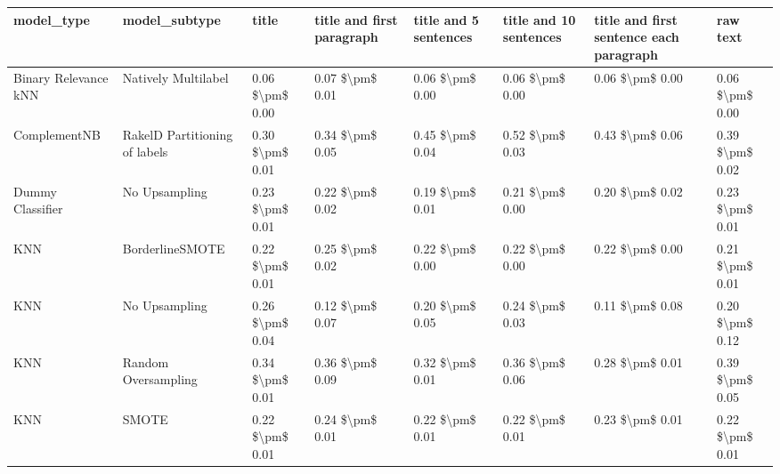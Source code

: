 \begin{tabular}{llllllll}
\toprule
                     model\_type &                 model\_subtype &           title & title and first paragraph & title and 5 sentences & title and 10 sentences & title and first sentence each paragraph &            raw text \\
\midrule
           Binary Relevance kNN &           Natively Multilabel & 0.06 \$\textbackslash pm\$ 0.00 &           0.07 \$\textbackslash pm\$ 0.01 &       0.06 \$\textbackslash pm\$ 0.00 &        0.06 \$\textbackslash pm\$ 0.00 &                         0.06 \$\textbackslash pm\$ 0.00 &     0.06 \$\textbackslash pm\$ 0.00 \\
                   ComplementNB & RakelD Partitioning of labels & 0.30 \$\textbackslash pm\$ 0.01 &           0.34 \$\textbackslash pm\$ 0.05 &       0.45 \$\textbackslash pm\$ 0.04 &        0.52 \$\textbackslash pm\$ 0.03 &                         0.43 \$\textbackslash pm\$ 0.06 &     0.39 \$\textbackslash pm\$ 0.02 \\
               Dummy Classifier &                 No Upsampling & 0.23 \$\textbackslash pm\$ 0.01 &           0.22 \$\textbackslash pm\$ 0.02 &       0.19 \$\textbackslash pm\$ 0.01 &        0.21 \$\textbackslash pm\$ 0.00 &                         0.20 \$\textbackslash pm\$ 0.02 &     0.23 \$\textbackslash pm\$ 0.01 \\
                            KNN &               BorderlineSMOTE & 0.22 \$\textbackslash pm\$ 0.01 &           0.25 \$\textbackslash pm\$ 0.02 &       0.22 \$\textbackslash pm\$ 0.00 &        0.22 \$\textbackslash pm\$ 0.00 &                         0.22 \$\textbackslash pm\$ 0.00 &     0.21 \$\textbackslash pm\$ 0.01 \\
                            KNN &                 No Upsampling & 0.26 \$\textbackslash pm\$ 0.04 &           0.12 \$\textbackslash pm\$ 0.07 &       0.20 \$\textbackslash pm\$ 0.05 &        0.24 \$\textbackslash pm\$ 0.03 &                         0.11 \$\textbackslash pm\$ 0.08 &     0.20 \$\textbackslash pm\$ 0.12 \\
                            KNN &           Random Oversampling & 0.34 \$\textbackslash pm\$ 0.01 &           0.36 \$\textbackslash pm\$ 0.09 &       0.32 \$\textbackslash pm\$ 0.01 &        0.36 \$\textbackslash pm\$ 0.06 &                         0.28 \$\textbackslash pm\$ 0.01 &     0.39 \$\textbackslash pm\$ 0.05 \\
                            KNN &                         SMOTE & 0.22 \$\textbackslash pm\$ 0.01 &           0.24 \$\textbackslash pm\$ 0.01 &       0.22 \$\textbackslash pm\$ 0.01 &        0.22 \$\textbackslash pm\$ 0.01 &                         0.23 \$\textbackslash pm\$ 0.01 &     0.22 \$\textbackslash pm\$ 0.01 \\

\end{tabular}
